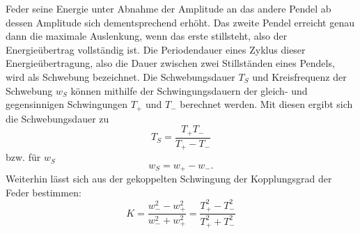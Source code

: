 \begin{itemize}
Feder seine Energie unter Abnahme der Amplitude an das andere Pendel ab dessen Amplitude sich 
dementsprechend erhöht. Das zweite Pendel erreicht genau dann die maximale Auslenkung, wenn das 
erste stillsteht, also der Energieübertrag vollständig ist. Die Periodendauer eines Zyklus dieser 
Energieübertragung, also die Dauer zwischen zwei Stillständen eines Pendels, wird als Schwebung 
bezeichnet. \newline
Die Schwebungsdauer $T_S$ und Kreisfrequenz der Schwebung $w_S$ 
können mithilfe der Schwingungsdauern der gleich- und gegensinnigen 
Schwingungen $T_+$ und $T_-$ berechnet werden. Mit diesen ergibt sich die Schwebungsdauer zu
\begin{equation}
    \label{eq:TS}
T_S=\frac{T_+T_-}{T_+-T_-}
\end{equation}
bzw. für $w_S$
\begin{equation}
w_S=w_+-w_-.
\end{equation}
Weiterhin lässt sich aus der gekoppelten Schwingung der Kopplungsgrad der Feder bestimmen:
\begin{equation}
    \label{eq:kappa}
K=\frac{w_-^2-w_+^2}{w_-^2+w_+^2}=\frac{T_+^2-T_-^2}{T_+^2+T_-^2}
\end{equation}
\end{itemize}

